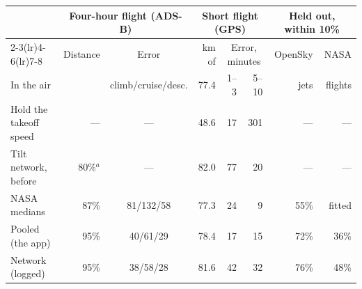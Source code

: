 \begin{tabular}{lrcrrrrr}
\toprule
 & \multicolumn{2}{c}{Four-hour flight (ADS-B)} & \multicolumn{3}{c}{Short flight (GPS)} & \multicolumn{2}{c}{Held out, within 10\%}\\
\cmidrule(lr){2-3}\cmidrule(lr){4-6}\cmidrule(lr){7-8}
 & Distance & Error & km of & \multicolumn{2}{c}{Error, minutes} & OpenSky & NASA\\
In the air & & climb/cruise/desc. & 77.4 & 1--3 & 5--10 & jets & flights\\
\midrule
Hold the takeoff speed & --- & --- & 48.6 & 17 & 301 & --- & --- \\
Tilt network, before & 80\%$^a$ & --- & 82.0 & 77 & 20 & --- & --- \\
NASA medians & 87\% & 81/132/58 & 77.3 & 24 & 9 & 55\% & fitted \\
Pooled (the app) & 95\% & 40/61/29 & 78.4 & 17 & 15 & 72\% & 36\% \\
Network (logged) & 95\% & 38/58/28 & 81.6 & 42 & 32 & 76\% & 48\% \\
\bottomrule
\end{tabular}
